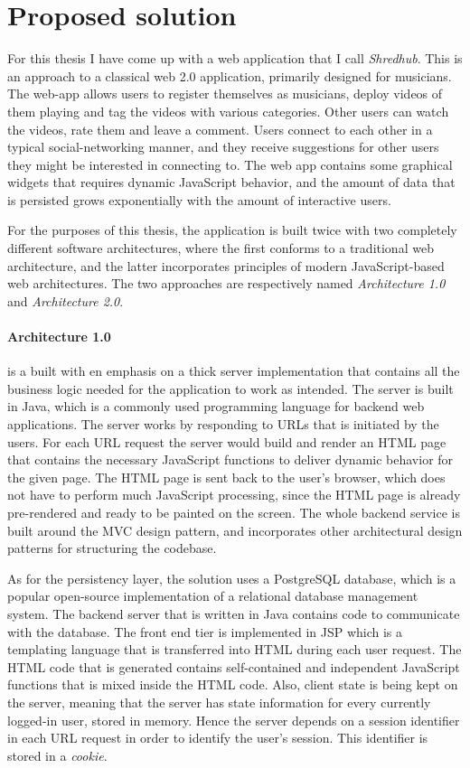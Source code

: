\section{Proposed solution}
For this thesis I have come up with a web application that I call \textit{Shredhub}. This is an approach to a classical web 2.0 application, primarily designed for musicians. The web-app allows users to register themselves as musicians, deploy videos of them playing and tag the videos with various categories. Other users can watch the videos, rate them and leave a comment. Users connect to each other in a typical social-networking manner, and they receive suggestions for other users they might be interested in connecting to. The web app contains some graphical widgets that requires dynamic JavaScript behavior, and the amount of data that is persisted grows exponentially with the amount of interactive users. 

For the purposes of this thesis, the application is built twice with two completely different software architectures, where the first conforms to a traditional web architecture, and the latter incorporates principles of modern JavaScript-based web architectures. The two approaches are respectively named \textit{Architecture 1.0} and \textit{Architecture 2.0}.

\paragraph{Architecture 1.0} is a built with en emphasis on a thick server implementation that contains all the business logic needed for the application to work as intended. The server is built in Java, which is a commonly used programming language for backend web applications. The server works by responding to URLs that is initiated by the users. For each URL request the server would build and render an HTML page that contains the necessary JavaScript functions to deliver dynamic behavior for the given page. The HTML page is sent back to the user's browser, which does not have to perform much JavaScript processing, since the HTML page is already pre-rendered and ready to be painted on the screen. The whole backend service is built around the MVC design pattern, and incorporates other architectural design patterns for structuring the codebase.

As for the persistency layer, the solution uses a PostgreSQL database, which is a popular open-source implementation of a relational database management system. The backend server that is written in Java contains code to communicate with the database.  The front end tier is implemented in JSP which is a templating language that is transferred into HTML during each user request. The HTML code that is generated contains self-contained and independent JavaScript functions that is mixed inside the HTML code.
Also, client state is being kept on the server, meaning that the server has state information for every currently logged-in user, stored in memory. Hence the server depends on a session identifier in each URL request in order to identify the user's session. This identifier is stored in a \textit{cookie}.

